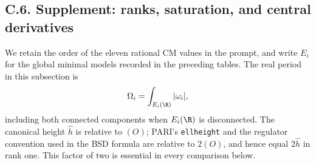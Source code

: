 \subsection{C.6. Supplement: ranks, saturation, and central derivatives}

We retain the order of the eleven rational CM values in the prompt, and
write $E_i$ for the global minimal models recorded in the preceding
tables. The real period in this subsection is
\[
 \Omega_i=\int_{E_i(\R)}|\omega_i|,
\]
including both connected components when $E_i(\R)$ is disconnected.
The canonical height $\widehat h$ is relative to $(O)$; PARI's
\texttt{ellheight} and the regulator convention used in the BSD formula
are relative to $2(O)$, and hence equal $2\widehat h$ in rank one.
This factor of two is essential in every comparison below.

